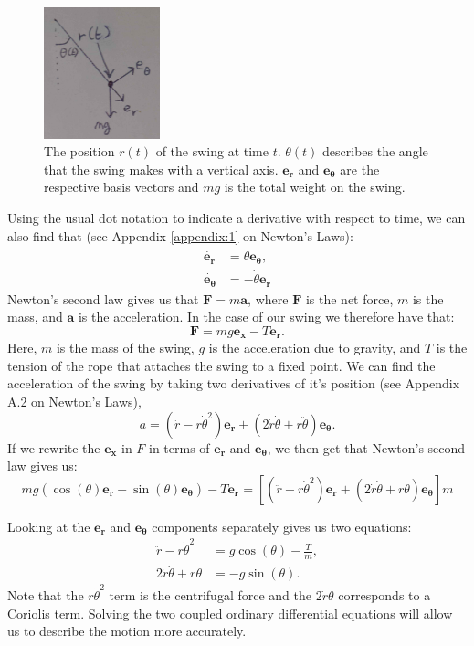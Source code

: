 \documentclass[12pt]{article}
\begin{document}
\begin{figure}[ht]
    \centering
    \includegraphics[width=0.3\textwidth]{Figures/Swing.png}
    \caption{The position $r(t)$ of the swing at time $t$. $\theta(t)$ describes the angle that the swing makes with a vertical axis. $\mathbf{e_r}$ and $\mathbf{e_\theta}$ are the respective basis vectors and $mg$ is the total weight on the swing. \label{figBasis}} %
\end{figure}
Using the usual dot notation to indicate a derivative with respect to time, we can also find that (see Appendix \ref{appendix:1} on Newton's Laws):
\begin{align}
    \dot{\mathbf{e_r}} &=  \dot{\theta}\mathbf{e_\theta},\\
    \dot{\mathbf{e_\theta}} &= -\dot{\theta} \mathbf{e_r}
\end{align}
Newton's second law gives us that $\mathbf{F} = m\mathbf{a}$, where $\mathbf{F}$ is the net force, $m$ is the mass, and $\mathbf{a}$ is the acceleration. In the case of our swing we therefore have that:
$$\mathbf{F} = mg \mathbf{e_x} - T \mathbf{e_r}.$$
Here, $m$ is the mass of the swing, $g$ is the acceleration due to gravity, and $T$ is the tension of the rope that attaches the swing to a fixed point. We can find the acceleration of the swing by taking two derivatives of it's position (see Appendix A.2 on Newton's Laws),
$$
    a = (\ddot{r} - r \dot{\theta}^2) \mathbf{e_r} + (2\dot{r} \dot{\theta} + r \ddot{\theta}) \mathbf{e_\theta}.
$$
If we rewrite the $\mathbf{e_x}$ in $F$ in terms of $\mathbf{e_r}$ and $\mathbf{e_\theta}$, we then get that Newton's second law gives us:
$$mg(\cos(\theta) \mathbf{e_r} - \sin(\theta) \mathbf{e_\theta}) - T\mathbf{e_r} = [(\ddot{r} - r \dot{\theta}^2) \mathbf{e_r} + (2\dot{r} \dot{\theta} + r \ddot{\theta}) \mathbf{e_\theta}]m$$

Looking at the $\mathbf{e_r}$ and $\mathbf{e_\theta}$ components separately gives us two equations:
\begin{align}
    \ddot{r} - r \dot{\theta}^2 &= g\cos(\theta) - \frac{T}{m},\label{ODE1}\\
    2\dot{r} \dot{\theta} + r \ddot{\theta} &= -g\sin(\theta).\label{ODE2}
\end{align}
Note that the $r \dot{\theta}^2$ term is the centrifugal force and the $2 \dot{r}\dot{\theta}$ corresponds to a Coriolis term.  Solving the two coupled ordinary differential equations will allow us to describe the motion more accurately.
\end{document}
